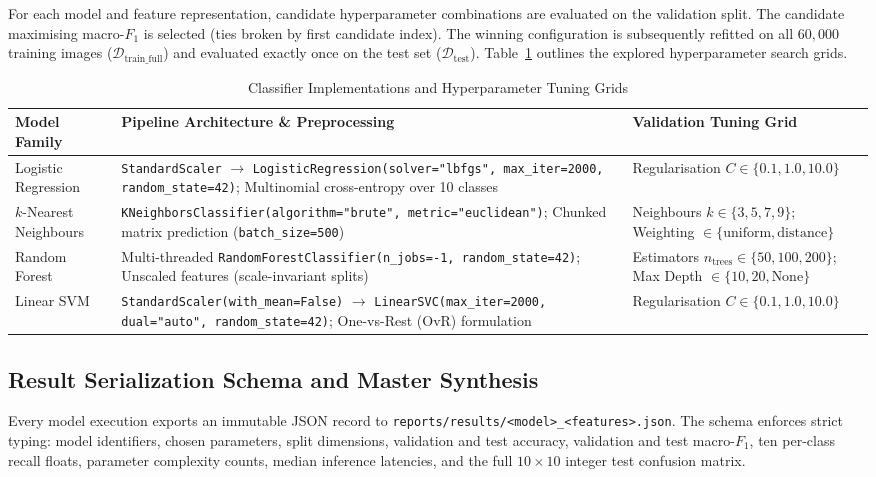 \documentclass[conference]{IEEEtran}
\newcommand{\code}[1]{\texttt{#1}}
\newcommand{\file}[1]{\texttt{#1}}
\begin{document}
For each model and feature representation, candidate hyperparameter
combinations are evaluated on the validation split. The candidate
maximising macro-$F_1$ is selected (ties broken by first candidate index).
The winning configuration is subsequently refitted on all $60{,}000$
training images ($\mathcal{D}_{\text{train\_full}}$) and evaluated exactly
once on the test set ($\mathcal{D}_{\text{test}}$). Table~\ref{tab:grids}
outlines the explored hyperparameter search grids.

\begin{table}[!t]
\centering
\caption{Classifier Implementations and Hyperparameter Tuning Grids}
\label{tab:grids}
\begin{tabularx}{\textwidth}{>{\raggedright\arraybackslash}p{2.6cm}
                             >{\raggedright\arraybackslash}X
                             >{\raggedright\arraybackslash}p{4.8cm}}
\toprule
Model Family & Pipeline Architecture \& Preprocessing & Validation Tuning Grid\\
\midrule
Logistic Regression & \code{StandardScaler} $\to$
  \code{LogisticRegression(solver="lbfgs", max\_iter=2000, random\_state=42)};
  Multinomial cross-entropy over 10 classes
  & Regularisation $C \in \{0.1, 1.0, 10.0\}$\\
\addlinespace[3pt]
$k$-Nearest Neighbours & \code{KNeighborsClassifier(algorithm="brute", metric="euclidean")};
  Chunked matrix prediction (\code{batch\_size=500})
  & Neighbours $k \in \{3, 5, 7, 9\}$;\newline
    Weighting $\in \{\text{uniform}, \text{distance}\}$\\
\addlinespace[3pt]
Random Forest & Multi-threaded \code{RandomForestClassifier(n\_jobs=-1, random\_state=42)};
  Unscaled features (scale-invariant splits)
  & Estimators $n_{\text{trees}} \in \{50, 100, 200\}$;\newline
    Max Depth $\in \{10, 20, \text{None}\}$\\
\addlinespace[3pt]
Linear SVM & \code{StandardScaler(with\_mean=False)} $\to$
  \code{LinearSVC(max\_iter=2000, dual="auto", random\_state=42)};
  One-vs-Rest (OvR) formulation
  & Regularisation $C \in \{0.1, 1.0, 10.0\}$\\
\bottomrule
\end{tabularx}
\end{table}

\subsection{Result Serialization Schema and Master Synthesis}
Every model execution exports an immutable JSON record to
\file{reports/results/<model>\_<features>.json}. The schema enforces
strict typing: model identifiers, chosen parameters, split dimensions,
validation and test accuracy, validation and test macro-$F_1$, ten
per-class recall floats, parameter complexity counts, median inference
latencies, and the full $10\times 10$ integer test confusion matrix.
\end{document}
